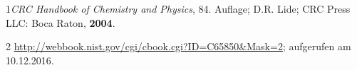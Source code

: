 \documentclass[12pt,a4paper,titlepage,headinclude,bibtotoc]{scrartcl}
\begin{document}
1\quad \emph{CRC Handbook of Chemistry and Physics}, 84. Auflage; D.R. Lide; CRC Press LLC: Boca Raton, \textbf{2004}.
\vspace{0,5 cm}


2 \quad \url{http://webbook.nist.gov/cgi/cbook.cgi?ID=C65850&Mask=2}; aufgerufen am 10.12.2016.\\
\vspace{0,5 cm}










\end{document}

